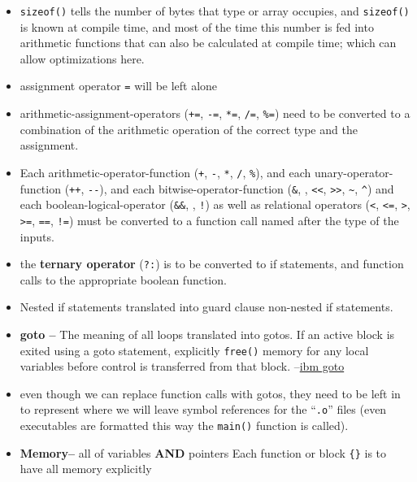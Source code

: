 \begin{itemize}
\tightlist
\item
  \texttt{sizeof()} tells the number of bytes that type or array
  occupies, and \texttt{sizeof()} is known at compile time, and most of
  the time this number is fed into arithmetic functions that can also be
  calculated at compile time; which can allow optimizations here.
\item
  assignment operator \texttt{=} will be left alone
\item
  arithmetic-assignment-operators (\texttt{+=}, \texttt{-=},
  \texttt{*=}, \texttt{/=}, \texttt{\%=}) need to be converted to a
  combination of the arithmetic operation of the correct type and the
  assignment.
\item
  Each arithmetic-operator-function (\texttt{+}, \texttt{-}, \texttt{*},
  \texttt{/}, \texttt{\%}), and each unary-operator-function
  (\texttt{++}, \texttt{-\/-}), and each bitwise-operator-function
  (\texttt{\&}, \texttt{\textbar{}}, \texttt{\textless{}\textless{}},
  \texttt{\textgreater{}\textgreater{}}, \texttt{\textasciitilde{}},
  \texttt{\^{}}) and each boolean-logical-operator (\texttt{\&\&},
  \texttt{\textbar{}\textbar{}}, \texttt{!}) as well as relational
  operators (\texttt{\textless{}}, \texttt{\textless{}=},
  \texttt{\textgreater{}}, \texttt{\textgreater{}=}, \texttt{==},
  \texttt{!=}) must be converted to a function call named after the type
  of the inputs.
\item
  the \textbf{ternary operator} (\texttt{?:}) is to be converted to if
  statements, and function calls to the appropriate boolean function.
\item
  Nested if statements translated into guard clause non-nested if
  statements.
\item
  \textbf{goto --} The meaning of all loops translated into gotos. If an
  active block is exited using a goto statement, explicitly
  \texttt{free()} memory for any local variables before control is
  transferred from that block.
  --\href{https://www.ibm.com/docs/en/zos/2.1.0?topic=statements-goto-\%20statement}{ibm
  goto}
\item
  even though we can replace function calls with gotos, they need to be
  left in to represent where we will leave symbol references for the
  ``\texttt{.o}'' files (even executables are formatted this way the
  \texttt{main()} function is called).
\item
  \textbf{Memory--} all of variables \textbf{AND} pointers Each function
  or block \texttt{\{\}} is to have all memory explicitly

\end{itemize}
